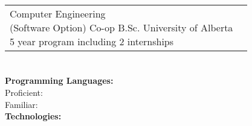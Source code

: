 \documentclass[a4paper]{modernsimplecv}
\begin{document}
\begin{paracol}{2}
        \switchcolumn

        \begin{minipage}[t]{\leftcolwidth}
            \vspace{1em}
            \section*{}
            \begin{tabular}{@{\raggedright}p{} |>{\raggedright\arraybackslash}p{}}
                \cvdegree
                {2017--2022}
                {Computer Engineering \newline (Software Option) Co-op}
                {B.Sc.}
                {University of Alberta\newline}
                {5 year program including 2 internships} \\
            \end{tabular}

            \vspace{1em}
            \section*{}
            \begin{minipage}[t]{\textwidth}
                \raggedright
                {\normalsize\textbf{Programming Languages:}}\\
                Proficient:     
                   \\
                Familiar:        \\
                {\normalsize\textbf{Technologies: }}
                    \\
            \end{minipage}

            \vspace{0pt}

\end{minipage}
\end{paracol}
\end{document}
